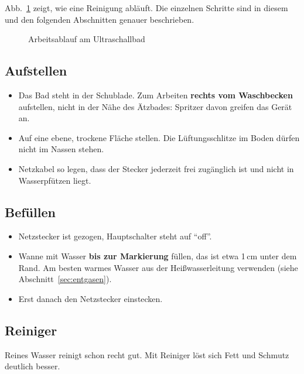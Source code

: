 \documentclass{\basedir/fablab-document}
\begin{document}
	Abb.~\ref{abb:ablauf} zeigt, wie eine Reinigung abläuft. Die einzelnen Schritte sind in diesem und den folgenden Abschnitten genauer beschrieben.

	\begin{figure}[H]
		\centering
		
		\caption{Arbeitsablauf am Ultraschallbad}
		\label{abb:ablauf}
	\end{figure}

	\subsection{Aufstellen}

	\begin{itemize}
		\item Das Bad steht in der Schublade. Zum Arbeiten \textbf{rechts vom Waschbecken} aufstellen, nicht in der Nähe des Ätzbades: Spritzer davon greifen das Gerät an.
		\item Auf eine ebene, trockene Fläche stellen. Die Lüftungsschlitze im Boden dürfen nicht im Nassen stehen.
		\item Netzkabel so legen, dass der Stecker jederzeit frei zugänglich ist und nicht in Wasserpfützen liegt.
	\end{itemize}

	\subsection{Befüllen}

	\begin{itemize}
		\item Netzstecker ist gezogen, Hauptschalter steht auf \enquote{off}.
		\item Wanne mit Wasser \textbf{bis zur Markierung} füllen, das ist etwa 1\,cm unter dem Rand. Am besten warmes Wasser aus der Heißwasserleitung verwenden (siehe Abschnitt~\ref{sec:entgasen}).
		\item Erst danach den Netzstecker einstecken.
	\end{itemize}

	\subsection{Reiniger}

	Reines Wasser reinigt schon recht gut. Mit Reiniger löst sich Fett und Schmutz deutlich besser.
\end{document}
